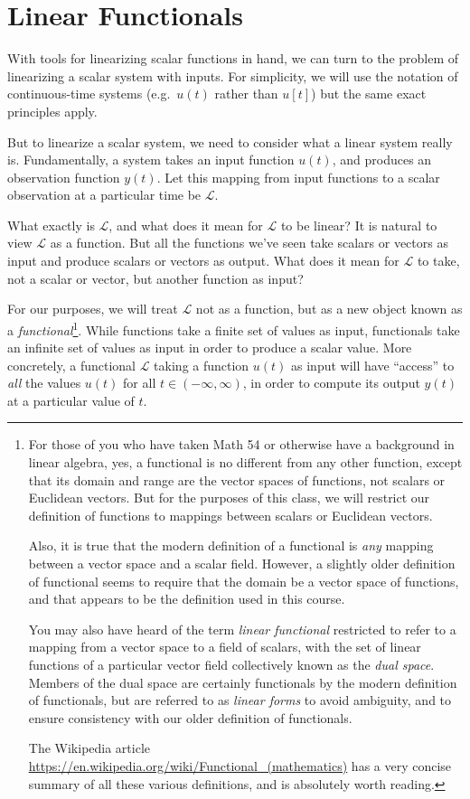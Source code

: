 \documentclass[letterpaper]{article}
\theoremstyle{remark}
\begin{document}
\section{Linear Functionals}
With tools for linearizing scalar functions in hand, we can turn to the problem of linearizing a scalar system with inputs. For simplicity, we will use the notation of continuous-time systems (e.g.\ $u(t)$ rather than $u[t]$) but the same exact principles apply.

But to linearize a scalar system, we need to consider what a linear system really is. Fundamentally, a system takes an input function $u(t)$, and produces an observation function $y(t)$. Let this mapping from input functions to a scalar observation at a particular time be $\mathcal{L}$. 

What exactly is $\mathcal{L}$, and what does it mean for $\mathcal{L}$ to be linear? It is natural to view $\mathcal{L}$ as a function. But all the functions we've seen take scalars or vectors as input and produce scalars or vectors as output. What does it mean for $\mathcal{L}$ to take, not a scalar or vector, but another function as input?

For our purposes, we will treat $\mathcal{L}$ not as a function, but as a new object known as a \emph{functional}\footnote{For those of you who have taken Math 54 or otherwise have a background in linear algebra, yes, a functional is no different from any other function, except that its domain and range are the vector spaces of functions, not scalars or Euclidean vectors. But for the purposes of this class, we will restrict our definition of functions to mappings between scalars or Euclidean vectors. 

Also, it is true that the modern definition of a functional is \emph{any} mapping between a vector space and a scalar field. However, a slightly older definition of functional seems to require that the domain be a vector space of functions, and that appears to be the definition used in this course. 

You may also have heard of the term \emph{linear functional} restricted to refer to a mapping from a vector space to a field of scalars, with the set of linear functions of a particular vector field collectively known as the \emph{dual space}. Members of the dual space are certainly functionals by the modern definition of functionals, but are referred to as \emph{linear forms} to avoid ambiguity, and to ensure consistency with our older definition of functionals.

The Wikipedia article \url{https://en.wikipedia.org/wiki/Functional_(mathematics)} has a very concise summary of all these various definitions, and is absolutely worth reading.}. While functions take a finite set of values as input, functionals take an infinite set of values as input in order to produce a scalar value. More concretely, a functional $\mathcal{L}$ taking a function $u(t)$ as input will have ``access'' to \emph{all} the values $u(t)$ for all $t \in (-\infty, \infty)$, in order to compute its output $y(t)$ at a particular value of $t$.
\end{document}
